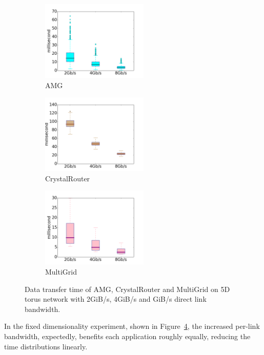 \documentclass[conference]{IEEEtran}
\begin{document}
\begin{figure}[t!]
    \centering
    \begin{subfigure}[t]{0.32\textwidth}
        \centering
        \includegraphics[height=1.5in]{figs/bandwidthstudy/amg_bw_box}
        \caption{AMG}
        \label{fig:bdwstudy-amg}
    \end{subfigure}%
    \hspace{1em}%
    \begin{subfigure}[t]{0.32\textwidth}
        \centering
        \includegraphics[height=1.5in]{figs/bandwidthstudy/cr_bw_box}
        \caption{CrystalRouter}
        \label{fig:bdwstudy-cr}
    \end{subfigure}%
    \begin{subfigure}[t]{0.32\textwidth}
        \centering
        \includegraphics[height=1.5in]{figs/bandwidthstudy/mg_bw_box}
        \caption{MultiGrid}
        \label{fig:bdwstudy-mg}
    \end{subfigure}%
   \caption{Data transfer time of AMG, CrystalRouter and MultiGrid on 5D torus network with 2GiB/s, 4GiB/s and GiB/s direct link bandwidth. }
   \label{fig:bandwidth-study}
\end{figure}

In the fixed dimensionality experiment, shown in Figure~\ref{fig:bandwidth-study}, the increased per-link bandwidth, expectedly, benefits each application roughly equally, reducing the time distributions linearly.
\end{document}
